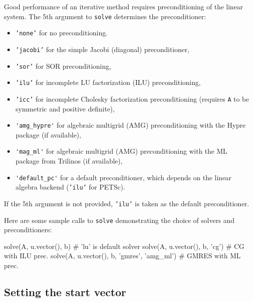 Good performance of an iterative method requires preconditioning of
the linear system. The 5th argument to {\fontsize{10pt}{10pt}\texttt{solve}} determines the
preconditioner:
\begin{itemize}
\item {\fontsize{10pt}{10pt}\texttt{'none'}} for no preconditioning.
\item {\fontsize{10pt}{10pt}\texttt{'jacobi'}} for the simple Jacobi (diagonal) preconditioner,
\item {\fontsize{10pt}{10pt}\texttt{'sor'}} for SOR preconditioning,
\item {\fontsize{10pt}{10pt}\texttt{'ilu'}} for incomplete LU factorization (ILU) preconditioning,
\item {\fontsize{10pt}{10pt}\texttt{'icc'}} for incomplete Cholesky factorization preconditioning
(requires {\fontsize{10pt}{10pt}\texttt{A}} to be symmetric and positive definite),
\item {\fontsize{10pt}{10pt}\verb!'amg_hypre'!} for algebraic multigrid (AMG) preconditioning
with the Hypre package (if available),
\item {\fontsize{10pt}{10pt}\verb!'mag_ml'!} for algebraic multigrid (AMG) preconditioning
with the ML package from Trilinos (if available),
\item {\fontsize{10pt}{10pt}\verb!'default_pc'!} for a default preconditioner, which depends
on the linear algebra backend ({\fontsize{10pt}{10pt}\texttt{'ilu'}} for PETSc).
\end{itemize}
If the 5th argument is not provided, {\fontsize{10pt}{10pt}\texttt{'ilu'}} is taken as the default
preconditioner.

Here are some sample calls to {\fontsize{10pt}{10pt}\texttt{solve}} demonstrating the choice
of solvers and preconditioners:
\begin{python}
solve(A, u.vector(), b)         # 'lu' is default solver
solve(A, u.vector(), b, 'cg')   # CG with ILU prec.
solve(A, u.vector(), b, 'gmres', 'amg_ml')  # GMRES with ML prec.
\end{python}


\subsection{Setting the start vector}

